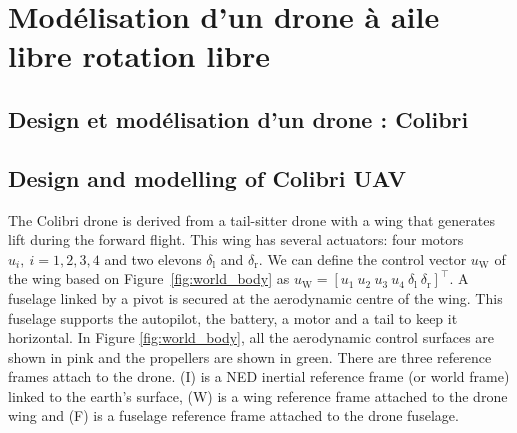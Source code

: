 \chapter{Modélisation d'un drone à aile libre rotation libre}
\minitoc

\section{Design et modélisation d'un drone : Colibri}
\section{Design and modelling of Colibri UAV}
\label{sec:model_colibri}
The Colibri drone is derived from a tail-sitter drone with a wing that generates lift during the forward flight. This wing has several actuators: four motors $u_{i}, ~i = 1,2,3,4$ and two elevons $\delta_{\text{l}}$ and $\delta_{\text{r}}$. We can define the control vector $u_{\text{W}}$ of the wing based on Figure~\ref{fig:world_body} as $u_{\text{W}} = [u_{1}~u_{2}~u_{3}~u_{4}~\delta_{\text{l}}~\delta_{\text{r}}]^\top$. A fuselage linked by a pivot is secured at the aerodynamic centre of the wing. This fuselage supports the autopilot, the battery, a motor and a tail to keep it horizontal. In Figure \ref{fig:world_body}, all the aerodynamic control surfaces are shown in pink and the propellers are shown in green.
There are three reference frames attach to the drone. (I) is a NED inertial reference frame (or world frame) linked to the earth's surface, (W) is a wing reference frame attached to the drone wing and (F) is a fuselage reference frame attached to the drone fuselage.





